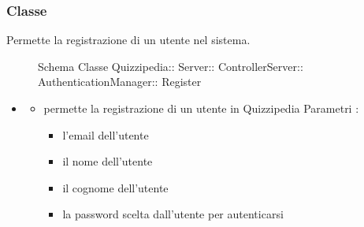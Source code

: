 \subsubsection{Classe }
Permette la registrazione di un utente nel sistema.
\begin{figure}[H]
\centering
\noindent{}
\caption[Schema Classe Register]{Schema Classe Quizzipedia:: Server:: ControllerServer:: AuthenticationManager:: Register}
\end{figure}
\begin{itemize}
\item {}
\begin{itemize}
\item {}
\newline
permette la registrazione di un utente in Quizzipedia
\newline
Parametri :
\begin{itemize}
\item {}
\newline
l'email dell'utente
\item {}
\newline
il nome dell'utente
\item {}
\newline
il cognome dell'utente
\item {}
\newline
la password scelta dall'utente per autenticarsi
\end{itemize}
\end{itemize}
\end{itemize}
